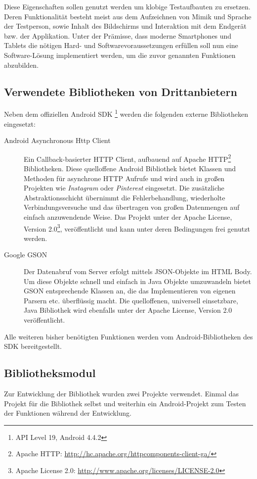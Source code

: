 Diese Eigenschaften sollen genutzt werden um klobige Testaufbauten zu ersetzen. 
Deren Funktionalität besteht meist aus dem Aufzeichnen von Mimik und Sprache der Testperson, sowie Inhalt des Bildschirms und Interaktion mit dem Endgerät bzw. der Applikation.
Unter der Prämisse, dass moderne Smartphones und Tablets die nötigen Hard- und Softwarevoraussetzungen erfüllen soll nun eine Software-Lösung implementiert werden, um die zuvor genannten Funktionen abzubilden.


\subsection{Verwendete Bibliotheken von Drittanbietern}
Neben dem offiziellen Android SDK \footnote{API Level 19, Android 4.4.2} werden die folgenden externe Bibliotheken eingesetzt:
\begin{description}
	\item[Android Asynchronous Http Client\footnotemark]  
	Ein Callback-basierter HTTP Client, aufbauend auf Apache HTTP\footnote{Apache HTTP: \url{http://hc.apache.org/httpcomponents-client-ga/}} Bibliotheken. Diese quelloffene Android Bibliothek bietet Klassen und Methoden für asynchrone HTTP Aufrufe und wird auch in großen Projekten wie \emph{Instagram} oder \emph{Pinterest} eingesetzt. 
	Die zusätzliche Abstraktionsschicht übernimmt die Fehlerbehandlung, wiederholte Verbindungsversuche und das übertragen von großen Datenmengen auf einfach anzuwendende Weise. 
	Das Projekt unter der Apache License, Version 2.0\footnote{Apache License 2.0: \label{ftn:apache_license} \url{http://www.apache.org/licenses/LICENSE-2.0}}, veröffentlicht und kann unter deren Bedingungen frei genutzt werden.
	\item[Google GSON\footnotemark] 
	Der Datenabruf vom Server erfolgt mittels \ac{JSON}-Objekte im HTML Body. Um diese Objekte schnell und einfach in Java Objekte umzuwandeln bietet GSON entsprechende Klassen an, die das Implementieren von eigenen Parsern etc. überflüssig macht.
	Die quelloffenen, universell einsetzbare, Java Bibliothek wird ebenfalls unter der Apache License, Version 2.0 veröffentlicht.
\end{description}
Alle weiteren bisher benötigten Funktionen werden vom Android-Bibliotheken des \ac{SDK} bereitgestellt.

\subsection{Bibliotheksmodul}
Zur Entwicklung der Bibliothek wurden zwei Projekte verwendet. 
Einmal das Projekt für die Bibliothek selbst und weiterhin ein Android-Projekt zum Testen der Funktionen während der Entwicklung. 

